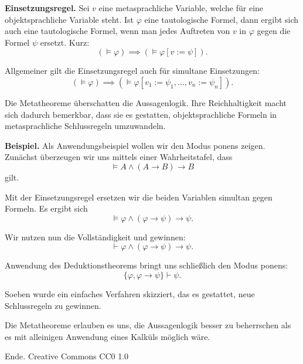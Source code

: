 \documentclass[9pt]{beamer}
\newcommand{\modest}[1]{{\small\color{gray}#1}}
\newcommand{\strong}[1]{\textsf{\textbf{#1}}}
\begin{document}
\begin{frame}
\strong{Einsetzungsregel.} Sei $v$ eine metasprachliche Variable,
welche für eine objektsprachliche Variable steht. Ist $\varphi$
eine tautologische Formel, dann ergibt sich auch eine tautologische
Formel, wenn man jedes Auftreten von $v$ in $\varphi$ gegen die
Formel $\psi$ ersetzt. Kurz:
\[(\models\varphi)\implies (\models\varphi[v:=\psi]).\]
\end{frame}

\begin{frame}
Allgemeiner gilt die Einsetzungsregel auch für simultane Einsetzungen:
\[(\models\varphi)\implies (\models\varphi[v_1:=\psi_1,\ldots,v_n:=\psi_n]).\]
\end{frame}

\begin{frame}
Die Metatheoreme überschatten die Aussagenlogik. Ihre Reichhaltigkeit
macht sich dadurch bemerkbar, dass sie es gestatten,
objektsprachliche Formeln in metasprachliche Schlussregeln
umzuwandeln.
\end{frame}

\begin{frame}
\strong{Beispiel.}
Als Anwendungsbeispiel wollen wir den Modus ponens zeigen.
Zunächst überzeugen wir uns mittels einer Wahrheitstafel, dass
\[\models A\land (A\rightarrow B)\rightarrow B\]
gilt.
\end{frame}

\begin{frame}
Mit der Einsetzungsregel ersetzen wir die beiden Variablen
simultan gegen Formeln. Es ergibt sich
\[\models\varphi\land (\varphi\rightarrow\psi)\rightarrow\psi.\]
\end{frame}

\begin{frame}
Wir nutzen nun die Vollständigkeit und
gewinnen:
\[\vdash\varphi\land (\varphi\rightarrow\psi)\rightarrow\psi.\]
\end{frame}

\begin{frame}
Anwendung des Deduktionstheorems bringt uns schließlich
den Modus ponens:
\[\{\varphi,\varphi\rightarrow\psi\}\vdash\psi.\]
\end{frame}

\begin{frame}
Soeben wurde ein einfaches Verfahren skizziert, das es gestattet, neue
Schlussregeln zu gewinnen.
\end{frame}

\begin{frame}
Die Metatheoreme erlauben es uns, die Aussagenlogik besser
zu beherrschen als es mit alleinigen Anwendung eines Kalküls möglich
wäre.
\end{frame}

\begin{frame}[t]
\vspace{4em}
Ende.
\vfill\hfill
\modest{Creative Commons CC0 1.0}
\end{frame}
\end{document}
